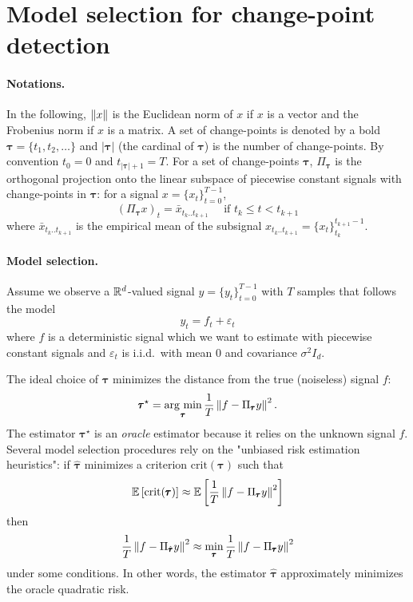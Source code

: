 \documentclass[11pt]{article}
\begin{document}
\newpage
\section{Model selection for change-point detection}

\paragraph{Notations.} In the following, $\left\lVert x\right\rVert$ is the Euclidean norm of $x$ if $x$ is a vector and the Frobenius norm if $x$ is a matrix. A set of change-points is denoted by a bold $\pmb{\tau}=\{t_1,t_2,\dots\}$ and $|\pmb{\tau}|$ (the cardinal of $\pmb{\tau}$) is the number of change-points.
By convention $t_0=0$ and $t_{|\pmb{\tau}|+1}=T$.
For a set of change-points $\pmb{\tau}$, $\Pi_{\pmb{\tau}}$ is the orthogonal projection onto the linear subspace of piecewise constant signals with change-points in $\pmb{\tau}$: for a signal $x=\{x_t\}_{t=0}^{T-1}$,
\begin{equation}
    \left(\Pi_{\pmb{\tau}}x\right)_t = \bar{x}_{t_k..t_{k+1}} \quad\text{ if } t_k\leq t < t_{k+1}
\end{equation}
where $\bar{x}_{t_k..t_{k+1}}$ is the empirical mean of the subsignal $x_{t_k..t_{k+1}}=\{x_t\}_{t_k}^{t_{k+1}-1}$.

\paragraph{Model selection.} Assume we observe a $\mathbb{R}^d$-valued signal $y=\{y_t\}_{t=0}^{T-1}$ with $T$ samples that follows the model
\begin{equation}
    y_t = f_t + \varepsilon_t 
\end{equation}
where $f$ is a deterministic signal which we want to estimate with piecewise constant signals and $\varepsilon_t$ is i.i.d.\ with mean 0 and covariance $\sigma^2 I_d$.

The ideal choice of $\pmb{\tau}$ minimizes the distance from the true (noiseless) signal $f$:
\begin{equation}
    \pmb{\tau}^\star = \operatorname*{\mbox{arg min}}_{\pmb{\tau}} \frac{1}{T}\left\lVert f - \Pi_{\pmb{\tau}}y\right\rVert^2.
\end{equation}
The estimator $\pmb{\tau}^\star$ is an \textit{oracle} estimator because it relies on the unknown signal $f$.
Several model selection procedures rely on the "unbiased risk estimation heuristics": if $\hat{\pmb{\tau}}$ minimizes a criterion $\text{crit}(\pmb{\tau})$ such that
\begin{equation}\label{eq:unbiased_risk_heuristics}
    \mathbb{E}\left[ \text{crit}(\pmb{\tau}) \right] \approx \mathbb{E}\left[ \frac{1}{T}\left\lVert f - \Pi_{\pmb{\tau}}y\right\rVert^2 \right]
\end{equation}
then 
\begin{equation}
    \frac{1}{T}\left\lVert f - \Pi_{\hat{\pmb{\tau}}}y\right\rVert^2 \approx \min_{\pmb{\tau}} \frac{1}{T}\left\lVert f - \Pi_{\pmb{\tau}}y\right\rVert^2
\end{equation}
under some conditions.
In other words, the estimator $\hat{\pmb{\tau}}$ approximately minimizes the oracle quadratic risk.
\end{document}
